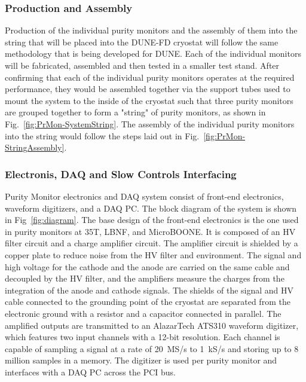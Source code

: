 \subsubsection{Production and Assembly}
\label{sec:PrMon-Production-Assembly}
Production of the individual purity monitors and the assembly of them into the string that will be placed into the DUNE-FD cryostat will follow the same methodology that is being developed for DUNE.  Each of the individual monitors will be fabricated, assembled and then tested in a smaller test stand.  After confirming that each of the individual purity monitors operates at the required performance, they would be assembled together via the support tubes used to mount the system to the inside of the cryostat such that three purity monitors are grouped together to form a "string" of purity monitors, as shown in Fig.~\ref{fig:PrMon-SystemString}.  The assembly of the individual purity monitors into the string would follow the steps laid out in Fig.~\ref{fig:PrMon-StringAssembly}.  




\subsubsection{Electronis, DAQ and Slow Controls Interfacing}

Purity Monitor electronics and DAQ system consist of front-end electronics, waveform digitizers, and a DAQ PC. The block diagram of the system is shown in Fig~\ref{fig:diagram}. The base design of the front-end electronics is the one used in purity monitors at 35T, LBNF, and MicroBOONE. It is composed of an HV filter circuit and a charge amplifier circuit. The amplifier circuit is shielded by a copper plate to reduce noise from the HV filter and environment. The signal and high voltage for the cathode and the anode are carried on the same cable and decoupled by the HV filter, and the amplifiers measure the charges from the integration of the anode and cathode signals. The shields of the signal and HV cable connected to the grounding point of the cryostat are separated from the electronic ground with a resistor and a capacitor connected in parallel. The amplified outputs are transmitted to an AlazarTech ATS310 waveform digitizer, which features two input channels with a 12-bit resolution. Each channel is capable of sampling a signal at a rate of 20~MS/s to 1~kS/s and storing up to 8 million samples in a memory. The digitizer is used per purity monitor and interfaces with a DAQ PC across the PCI bus.



